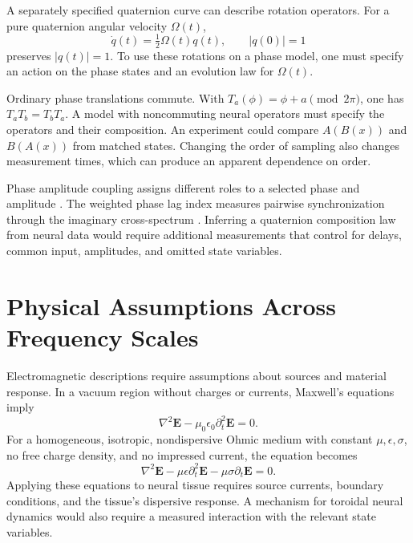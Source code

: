 \documentclass[12pt,a4paper]{article}
\begin{document}
A separately specified quaternion curve can describe rotation operators. For a pure quaternion angular velocity $\Omega(t)$,
\begin{equation}\label{eq:quat_dynamics}
 \dot q(t)=\tfrac12\Omega(t)q(t),\qquad |q(0)|=1
\end{equation}
preserves $|q(t)|=1$. To use these rotations on a phase model, one must specify an action on the phase states and an evolution law for $\Omega(t)$.

Ordinary phase translations commute. With $T_a(\phi)=\phi+a\pmod{2\pi}$, one has $T_aT_b=T_bT_a$. A model with noncommuting neural operators must specify the operators and their composition. An experiment could compare $A(B(x))$ and $B(A(x))$ from matched states. Changing the order of sampling also changes measurement times, which can produce an apparent dependence on order.

Phase amplitude coupling assigns different roles to a selected phase and amplitude \cite{Tort2010}. The weighted phase lag index measures pairwise synchronization through the imaginary cross-spectrum \cite{Vinck2011}. Inferring a quaternion composition law from neural data would require additional measurements that control for delays, common input, amplitudes, and omitted state variables.

\section{Physical Assumptions Across Frequency Scales}\label{app:physical}\label{sec:oscillatory}

Electromagnetic descriptions require assumptions about sources and material response. In a vacuum region without charges or currents, Maxwell's equations imply \cite{Tong2015}
\begin{equation}\label{eq:wave}
 \nabla^2\mathbf E-\mu_0\epsilon_0\partial_t^2\mathbf E=0.
\end{equation}
For a homogeneous, isotropic, nondispersive Ohmic medium with constant $\mu,\epsilon,\sigma$, no free charge density, and no impressed current, the equation becomes
\begin{equation}
 \nabla^2\mathbf E-\mu\epsilon\partial_t^2\mathbf E-\mu\sigma\partial_t\mathbf E=0.
\end{equation}
Applying these equations to neural tissue requires source currents, boundary conditions, and the tissue's dispersive response. A mechanism for toroidal neural dynamics would also require a measured interaction with the relevant state variables.
\end{document}
